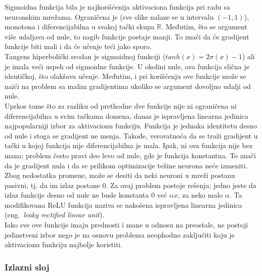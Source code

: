 Sigmoidna funkcija bila je najkorišćenija aktivaciona funkcija pri radu sa neuronskim mrežama. Ograničena je (sve slike nalaze se u intervalu $(-1, 1)$), monotona i diferencijabilna u svakoj tački skupa $\mathbb{R}$. Međutim, što se argument više udaljava od nule, to nagib funkcije postaje manji. To znači da će gradijent funkcije biti mali i da će učenje teći jako sporo. \\
Tangens hiperbolički srodan je sigmoidnoj funkciji ($tanh(x) = 2\sigma (x) - 1$) ali je imala veći uspeh od sigmoidne funkcije.  U okolini nule, ova funkcija slična je identičkoj, što olakšava učenje. Međutim, i pri korišćenju ove funkcije može se naići na problem sa malim gradijentima ukoliko se argument dovoljno udalji od nule.\\
Uprkos tome što za razliku od prethodne dve funkcije nije ni ograničena ni diferencijabilna u svim tačkama domena, danas je ispravljena linearna jedinica najpopularniji izbor za aktivacionu funkciju. Funkcija je jednaka identitetu desno od nule i stoga se gradijent ne menja. Takođe, verovatnoća da se traži gradijent u tački u kojoj funkcija nije diferencijabilna je mala. Ipak, ni ova funkcija nije bez mana; problem često pravi deo levo od nule, gde je funkcija konstantna. To znači da je gradijent nula i da se prilikom optimizacije težine neurona neće izmeniti. Zbog nedostatka promene, može se desiti da neki neuroni u mreži postanu pasivni, tj. da im izlaz postane $0$. Za ovaj problem postoje rešenja; jedno jeste da izlaz funkcije desno od nule ne bude konstanta $0$ već $\alpha x$, za neko malo $\alpha$. Ta modifikovana ReLU funkcija naziva se nakošena ispravljena linearna jedinica (eng.~{\em leaky rectified linear unit}). 
\\
Iako sve ove funkcije imaju prednosti i mane u odnosu na preostale, ne postoji jedinstveni izbor nego je na osnovu problema neophodno zaključiti koju je aktivacionu funkciju najbolje koristiti.

\subsubsection{Izlazni sloj}

